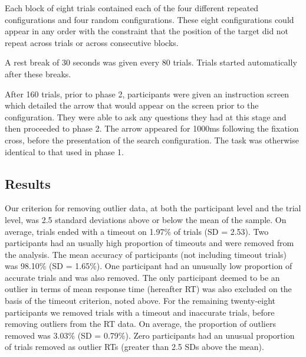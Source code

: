 \documentclass[
  man,
  floatsintext,
  longtable,
  nolmodern,
  notxfonts,
  notimes,
  colorlinks=true,linkcolor=blue,citecolor=blue,urlcolor=blue]{apa7}
\begin{document}
Each block of eight trials contained each of the four different repeated
configurations and four random configurations. These eight
configurations could appear in any order with the constraint that the
position of the target did not repeat across trials or across
consecutive blocks.

A rest break of 30 seconds was given every 80 trials. Trials started
automatically after these breaks.

After 160 trials, prior to phase 2, participants were given an
instruction screen which detailed the arrow that would appear on the
screen prior to the configuration. They were able to ask any questions
they had at this stage and then proceeded to phase 2. The arrow appeared
for 1000ms following the fixation cross, before the presentation of the
search configuration. The task was otherwise identical to that used in
phase 1.

\subsection{Results}\label{results}

Our criterion for removing outlier data, at both the participant level
and the trial level, was 2.5 standard deviations above or below the mean
of the sample. On average, trials ended with a timeout on 1.97\% of
trials (SD = 2.53). Two participants had an usually high proportion of
timeouts and were removed from the analysis. The mean accuracy of
participants (not including timeout trials) was 98.10\% (SD = 1.65\%).
One participant had an unusually low proportion of accurate trials and
was also removed. The only participant deemed to be an outlier in terms
of mean response time (hereafter RT) was also excluded on the basis of
the timeout criterion, noted above. For the remaining twenty-eight
participants we removed trials with a timeout and inaccurate trials,
before removing outliers from the RT data. On average, the proportion of
outliers removed was 3.03\% (SD = 0.79\%). Zero participants had an
unusual proportion of trials removed as outlier RTs (greater than 2.5
SDs above the mean).
\end{document}
